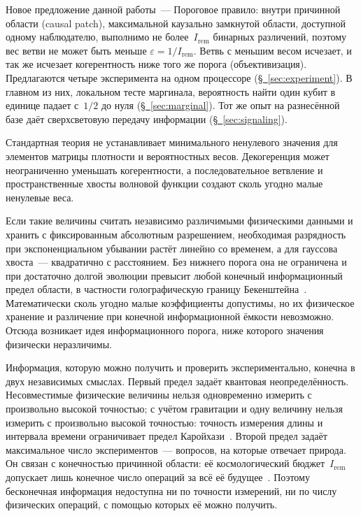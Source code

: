 \documentclass[11pt,a4paper]{article}
\newcommand{\Ost}{I_{\mathrm{rem}}}
\newcommand{\CollapseRule}{Пороговое правило}
\begin{document}
Новое предложение данной работы~--- \CollapseRule{}: внутри причинной области (causal patch), максимальной каузально замкнутой области, доступной одному наблюдателю, выполнимо не более~$\Ost$ бинарных различений, поэтому вес ветви не может быть меньше $\varepsilon=1/\Ost$. Ветвь с меньшим весом исчезает, и так же исчезает когерентность ниже того же порога (объективизация). Предлагаются четыре эксперимента на одном процессоре (\hyperref[sec:experiment]{\S~\ref*{sec:experiment}}). В главном из них, локальном тесте маргинала, вероятность найти один кубит в единице падает с~$1/2$ до нуля (\hyperref[sec:marginal]{\S~\ref*{sec:marginal}}). Тот же опыт на разнесённой базе даёт сверхсветовую передачу информации (\hyperref[sec:signaling]{\S~\ref*{sec:signaling}}).

Стандартная теория не устанавливает минимального ненулевого значения для элементов матрицы плотности и вероятностных весов. Декогеренция может неограниченно уменьшать когерентности, а последовательное ветвление и пространственные хвосты волновой функции создают сколь угодно малые ненулевые веса.

Если такие величины считать независимо различимыми физическими данными и хранить с фиксированным абсолютным разрешением, необходимая разрядность при экспоненциальном убывании растёт линейно со временем, а для гауссова хвоста~--- квадратично с расстоянием. Без нижнего порога она не ограничена и при достаточно долгой эволюции превысит любой конечный информационный предел области, в частности голографическую границу Бекенштейна~\cite{bousso2002}. Математически сколь угодно малые коэффициенты допустимы, но их физическое хранение и различение при конечной информационной ёмкости невозможно. Отсюда возникает идея информационного порога, ниже которого значения физически неразличимы.

Информация, которую можно получить и проверить экспериментально, конечна в двух независимых смыслах. Первый предел задаёт квантовая неопределённость. Несовместимые физические величины нельзя одновременно измерить с произвольно высокой точностью; с учётом гравитации и одну величину нельзя измерить с произвольно высокой точностью: точность измерения длины и интервала времени ограничивает предел Каройхази~\cite{karolyhazy1966}. Второй предел задаёт максимальное число экспериментов~--- вопросов, на которые отвечает природа. Он связан с конечностью причинной области: её космологический бюджет~$\Ost$ допускает лишь конечное число операций за всё её будущее~\cite{lloyd2000,lloyd2002,banks2001,krauss2004}. Поэтому бесконечная информация недоступна ни по точности измерений, ни по числу физических операций, с помощью которых её можно получить.
\end{document}
